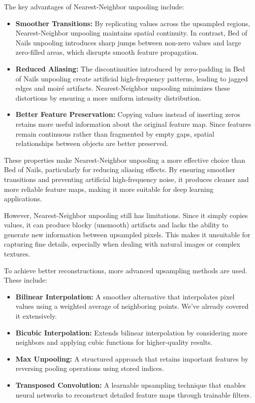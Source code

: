 \newpage

\noindent The key advantages of Nearest-Neighbor unpooling include:

\begin{itemize}
	\item \textbf{Smoother Transitions:} By replicating values across the upsampled regions, Nearest-Neighbor unpooling maintains spatial continuity. In contrast, Bed of Nails unpooling introduces sharp jumps between non-zero values and large zero-filled areas, which disrupts smooth feature propagation.
	\item \textbf{Reduced Aliasing:} The discontinuities introduced by zero-padding in Bed of Nails unpooling create artificial high-frequency patterns, leading to jagged edges and moiré artifacts. Nearest-Neighbor unpooling minimizes these distortions by ensuring a more uniform intensity distribution.
	\item \textbf{Better Feature Preservation:} Copying values instead of inserting zeros retains more useful information about the original feature map. Since features remain continuous rather than fragmented by empty gaps, spatial relationships between objects are better preserved.
\end{itemize}

\noindent These properties make Nearest-Neighbor unpooling a more effective choice than Bed of Nails, particularly for reducing aliasing effects. By ensuring smoother transitions and preventing artificial high-frequency noise, it produces cleaner and more reliable feature maps, making it more suitable for deep learning applications.

\noindent However, Nearest-Neighbor unpooling still has limitations. Since it simply copies values, it can produce blocky (unsmooth) artifacts and lacks the ability to generate new information between upsampled pixels. This makes it unsuitable for capturing fine details, especially when dealing with natural images or complex textures.

\noindent To achieve better reconstructions, more advanced upsampling methods are used. These include:
\begin{itemize}
	\item \textbf{Bilinear Interpolation:} A smoother alternative that interpolates pixel values using a weighted average of neighboring points. We've already covered it extensively. 
	\item \textbf{Bicubic Interpolation:} Extends bilinear interpolation by considering more neighbors and applying cubic functions for higher-quality results.
	\item \textbf{Max Unpooling:} A structured approach that retains important features by reversing pooling operations using stored indices.
	\item \textbf{Transposed Convolution:} A learnable upsampling technique that enables neural networks to reconstruct detailed feature maps through trainable filters.
\end{itemize}

